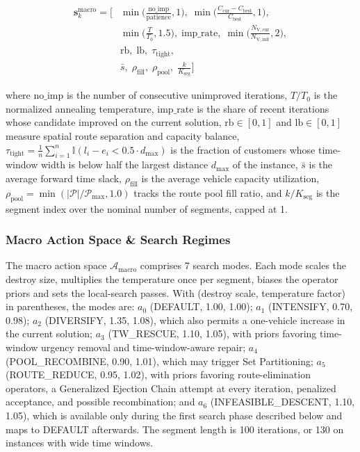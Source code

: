 \documentclass{ieeeaccess}
\newcommand{\NVs}[1]{N_{\mathrm{V},\text{#1}}}
\begin{document}
\begin{align}
  \mathbf{s}_k^{\text{macro}} = \Big[ 
    &\min\Big(\frac{\text{no\_imp}}{\text{patience}}, 1\Big), \; \min\Big(\frac{C_{\text{cur}} - C_{\text{best}}}{C_{\text{best}}}, 1\Big), \nonumber \\
    &\min\Big(\frac{T}{T_0}, 1.5\Big), \; \text{imp\_rate}, \; \min\Big(\frac{\NVs{cur}}{\NVs{init}}, 2\Big), \nonumber \\
    &\mathrm{rb}, \; \mathrm{lb}, \; \tau_{\text{tight}}, \nonumber \\
    &\bar{s}, \; \rho_{\text{fill}}, \; \rho_{\text{pool}}, \; \frac{k}{K_{\text{seg}}} \Big]
  \label{eq:macro_state}
\end{align}

where $\text{no\_imp}$ is the number of consecutive unimproved iterations, $T/T_0$ is the normalized annealing temperature, $\text{imp\_rate}$ is the share of recent iterations whose candidate improved on the current solution, $\mathrm{rb} \in [0, 1]$ and $\mathrm{lb} \in [0, 1]$ measure spatial route separation and capacity balance, $\tau_{\text{tight}} = \frac{1}{n}\sum_{i=1}^n \mathbb{I}(l_i - e_i < 0.5 \cdot d_{\max})$ is the fraction of customers whose time-window width is below half the largest distance $d_{\max}$ of the instance, $\bar{s}$ is the average forward time slack, $\rho_{\text{fill}}$ is the average vehicle capacity utilization, $\rho_{\text{pool}} = \min(|\mathcal{P}|/\mathcal{P}_{\max}, 1.0)$ tracks the route pool fill ratio, and $k/K_{\text{seg}}$ is the segment index over the nominal number of segments, capped at 1.

\subsubsection{Macro Action Space \& Search Regimes}
The macro action space $\mathcal{A}_{\text{macro}}$ comprises 7 search modes. Each mode scales the destroy size, multiplies the temperature once per segment, biases the operator priors and sets the local-search passes. With (destroy scale, temperature factor) in parentheses, the modes are: $a_0$ (\textsf{\small DEFAULT}, 1.00, 1.00); $a_1$ (\textsf{\small INTENSIFY}, 0.70, 0.98); $a_2$ (\textsf{\small DIVERSIFY}, 1.35, 1.08), which also permits a one-vehicle increase in the current solution; $a_3$ (\textsf{\small TW\_RESCUE}, 1.10, 1.05), with priors favoring time-window urgency removal and time-window-aware repair; $a_4$ (\textsf{\small POOL\_RECOMBINE}, 0.90, 1.01), which may trigger Set Partitioning; $a_5$ (\textsf{\small ROUTE\_REDUCE}, 0.95, 1.02), with priors favoring route-elimination operators, a Generalized Ejection Chain attempt at every iteration, penalized acceptance, and possible recombination; and $a_6$ (\textsf{\small INFEASIBLE\_DESCENT}, 1.10, 1.05), which is available only during the first search phase described below and maps to \textsf{\small DEFAULT} afterwards. The segment length is 100 iterations, or 130 on instances with wide time windows.
\end{document}
